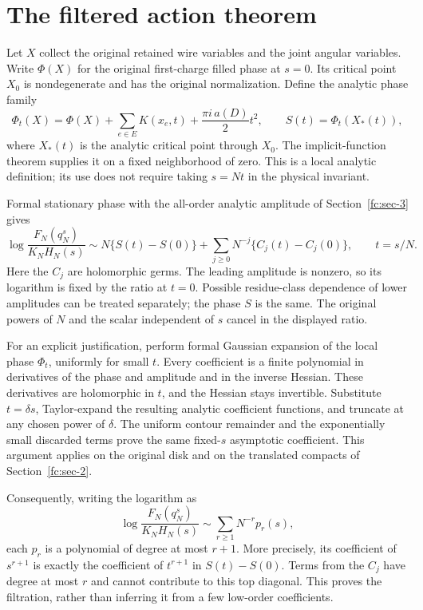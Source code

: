 \section{The filtered action theorem}\label{fc:sec-4}

Let \(X\) collect the original retained wire variables and the joint angular variables. Write \(\Phi(X)\) for the original first-charge filled phase at \(s=0\). Its critical point \(X_0\) is nondegenerate and has the original normalization. Define the analytic phase family
\begin{equation}\label{fc:eq-13}
\Phi_t(X)=\Phi(X)+\sum_{e\in E}K(x_e,t)
                         +\frac{\pi i\,a(D)}2t^2,
 \qquad
 S(t)=\Phi_t(X_*(t)),
\end{equation}
 where \(X_*(t)\) is the analytic critical point through \(X_0\). The implicit-function theorem supplies it on a fixed neighborhood of zero. This is a local analytic definition; its use does not require taking \(s=Nt\) in the physical invariant.

Formal stationary phase with the all-order analytic amplitude of Section~\ref{fc:sec-3} gives
\begin{equation}\label{fc:eq-14}
\log\frac{F_N(q_N^s)}{K_N H_N(s)}
 \sim N\{S(t)-S(0)\}
             +\sum_{j\ge0}N^{-j}\{C_j(t)-C_j(0)\},
 \qquad t=s/N.
\end{equation}
 Here the \(C_j\) are holomorphic germs. The leading amplitude is nonzero, so its logarithm is fixed by the ratio at \(t=0\). Possible residue-class dependence of lower amplitudes can be treated separately; the phase \(S\) is the same. The original powers of \(N\) and the scalar independent of \(s\) cancel in the displayed ratio.

For an explicit justification, perform formal Gaussian expansion of the local phase \(\Phi_t\), uniformly for small \(t\). Every coefficient is a finite polynomial in derivatives of the phase and amplitude and in the inverse Hessian. These derivatives are holomorphic in \(t\), and the Hessian stays invertible. Substitute \(t=\delta s\), Taylor-expand the resulting analytic coefficient functions, and truncate at any chosen power of \(\delta\). The uniform contour remainder and the exponentially small discarded terms prove the same fixed-\(s\) asymptotic coefficient. This argument applies on the original disk and on the translated compacts of Section~\ref{fc:sec-2}.

Consequently, writing the logarithm as
\begin{equation}\label{fc:eq-15}
\log\frac{F_N(q_N^s)}{K_N H_N(s)}
       \sim\sum_{r\ge1}N^{-r}p_r(s),
\end{equation}
 each \(p_r\) is a polynomial of degree at most \(r+1\). More precisely, its coefficient of \(s^{r+1}\) is exactly the coefficient of \(t^{r+1}\) in \(S(t)-S(0)\). Terms from the \(C_j\) have degree at most \(r\) and cannot contribute to this top diagonal. This proves the filtration, rather than inferring it from a few low-order coefficients.

